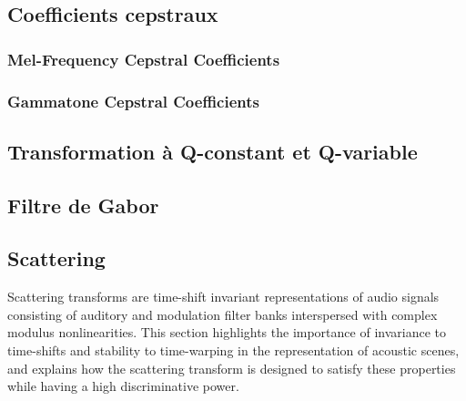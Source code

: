 \subsection{Coefficients cepstraux}

\subsubsection{Mel-Frequency Cepstral Coefficients}
\label{sec:ch6_mfcc}
 
\subsubsection{Gammatone Cepstral Coefficients}
\label{sec:ch6_Gammatone}
 
\subsection{Transformation à Q-constant et Q-variable}
 \label{sec:ch6_VQT_CQT}
 
\subsection{Filtre de Gabor}
\label{sec:ch6_gabor}

\subsection{Scattering}
\label{sec:ch6_scattering}

Scattering transforms are time-shift invariant representations of audio signals consisting of auditory and modulation filter banks interspersed with complex modulus nonlinearities.
This section highlights the importance of invariance to time-shifts and stability to time-warping in the representation of acoustic scenes, and explains how the scattering transform is designed to satisfy these properties while having a high discriminative power.

